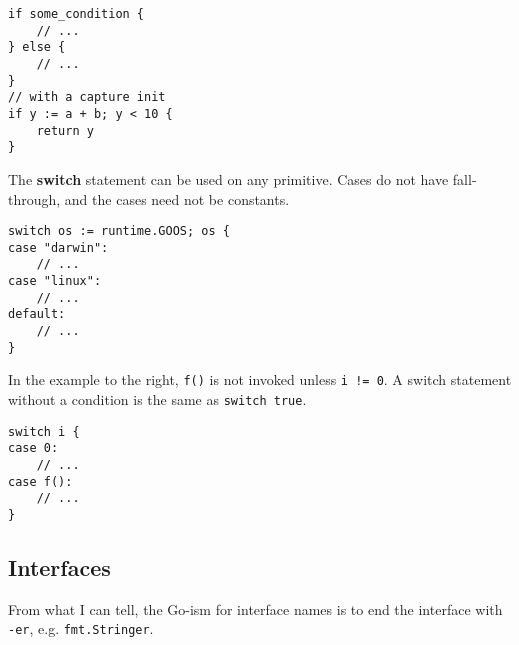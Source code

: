 \documentclass{article}
\begin{document}
\begin{paracol}{2}
\switchcolumn

\begin{lstlisting}
if some_condition {
    // ...
} else {
    // ...
}
// with a capture init
if y := a + b; y < 10 {
    return y
}
\end{lstlisting}


\switchcolumn*

\noindent The \textbf{switch} statement can be used on any primitive. Cases do not have fall-through, and the cases need not be constants.

\switchcolumn

\begin{lstlisting}
switch os := runtime.GOOS; os {
case "darwin":
    // ...
case "linux":
    // ...
default:
    // ...
}
\end{lstlisting}


\switchcolumn*
\noindent In the example to the right, \lstinline{f()} is not invoked unless \lstinline{i != 0}.
A switch statement without a condition is the same as \lstinline{switch true}.

\switchcolumn

\begin{lstlisting}
switch i {
case 0: 
    // ...
case f():
    // ...
}
\end{lstlisting}

\end{paracol}

\subsection{Interfaces}\label{s_interfaces}

From what I can tell, the Go-ism for interface names is to end the interface with \lstinline|-er|, e.g. \lstinline|fmt.Stringer|.
\\
\end{document}
